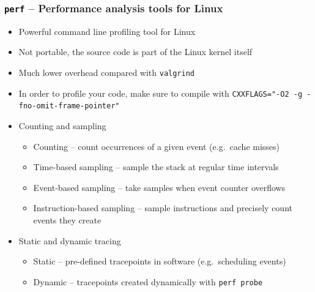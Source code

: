 \begin{frame}[fragile]
  \frametitle{\texttt{perf} -- Performance analysis tools for Linux}
  \setlength{\leftmargini}{0pt}
    \begin{itemize}
      \item Powerful command line profiling tool for Linux
      \item Not portable, the source code is part of the Linux kernel itself
      \item Much lower overhead compared with \texttt{valgrind}
      \item In order to profile your code, make sure to compile with
            \texttt{CXXFLAGS="-O2 -g -fno-omit-frame-pointer"}
      \item Counting and sampling
        \begin{itemize}
          \item Counting -- count occurrences of a given event (e.g.\ cache misses)
          \item Time-based sampling -- sample the stack at regular time intervals
          \item Event-based sampling -- take samples when event counter overflows
          \item Instruction-based sampling -- sample instructions and precisely count events they create
        \end{itemize}
      \item Static and dynamic tracing
        \begin{itemize}
          \item Static -- pre-defined tracepoints in software (e.g.\ scheduling events)
          \item Dynamic -- tracepoints created dynamically with \texttt{perf probe}
        \end{itemize}
    \end{itemize}
\end{frame}

